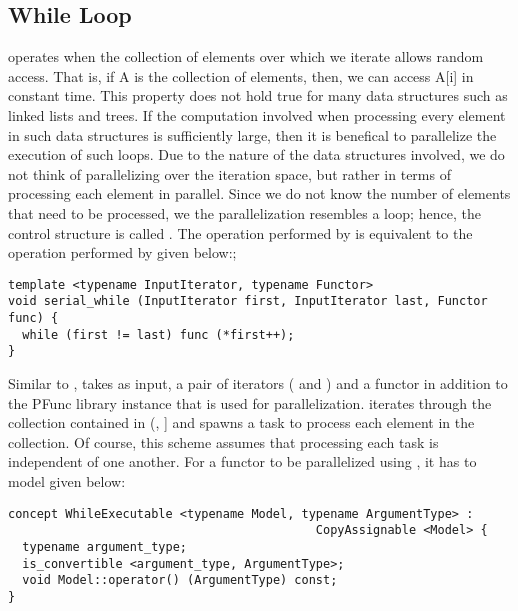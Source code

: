 \subsection{While Loop}
\label{subsec:while}
%
 operates when the collection of elements over which
we iterate allows random access. 
%
That is, if A is the collection of elements, then, we can access A[i] in
constant time. 
%
This property does not hold true for many data structures such as linked lists
and trees. 
%
If the computation involved when processing every element in such data
structures is sufficiently large, then it is benefical to parallelize the
execution of such loops.
%
Due to the nature of the data structures involved, we do not think of 
parallelizing over the iteration space, but rather in terms of processing 
each element in parallel. 
%
Since we do not know the number of elements that need to be processed, we the 
parallelization resembles a  loop; hence, the control structure 
is called .
%
The operation performed by  is equivalent to the 
operation performed by  given below:;
%
\begin{center}
\begin{minipage}{0.7\textwidth}
\begin{lstlisting}
template <typename InputIterator, typename Functor>
void serial_while (InputIterator first, InputIterator last, Functor func) {
  while (first != last) func (*first++);
}
\end{lstlisting}
\end{minipage}
\end{center}
%
Similar to ,  takes as input, a pair
of iterators ( and ) and a functor in addition to the
PFunc library instance that is used for parallelization.
%
 iterates through the collection contained in
(, ] and spawns a task to process each element in 
the collection.
%
Of course, this scheme assumes that processing each task is independent of one
another.
%
For a functor to be parallelized using , it has to 
model  given below:
%
\begin{center}
\begin{minipage}{0.7\textwidth}
\begin{lstlisting}
concept WhileExecutable <typename Model, typename ArgumentType> : 
                                           CopyAssignable <Model> {
  typename argument_type;
  is_convertible <argument_type, ArgumentType>;
  void Model::operator() (ArgumentType) const;
}
\end{lstlisting}
\end{minipage}
\end{center}
